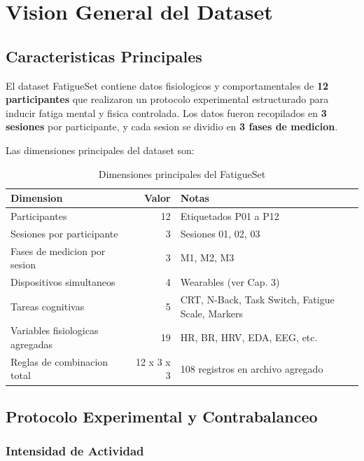 \chapter{Vision General del Dataset}
\label{cap:overview}

\section{Caracteristicas Principales}

El dataset FatigueSet contiene datos fisiologicos y comportamentales de
\textbf{12 participantes} que realizaron un protocolo experimental estructurado
para inducir fatiga mental y fisica controlada. Los datos fueron recopilados
en \textbf{3 sesiones} por participante, y cada sesion se dividio en
\textbf{3 fases de medicion}.

Las dimensiones principales del dataset son:

\begin{table}[H]
\centering
\caption{Dimensiones principales del FatigueSet}
\begin{tabular}{|l|r|p{5cm}|}
\hline
\textbf{Dimension} & \textbf{Valor} & \textbf{Notas} \\
\hline
Participantes & 12 & Etiquetados P01 a P12 \\
\hline
Sesiones por participante & 3 & Sesiones 01, 02, 03 \\
\hline
Fases de medicion por sesion & 3 & M1, M2, M3 \\
\hline
Dispositivos simultaneos & 4 & Wearables (ver Cap. 3) \\
\hline
Tareas cognitivas & 5 & CRT, N-Back, Task Switch, Fatigue Scale, Markers \\
\hline
Variables fisiologicas agregadas & 19 & HR, BR, HRV, EDA, EEG, etc. \\
\hline
Reglas de combinacion total & 12 x 3 x 3 & 108 registros en archivo agregado \\
\hline
\end{tabular}
\end{table}

\section{Protocolo Experimental y Contrabalanceo}

\subsection{Intensidad de Actividad}

